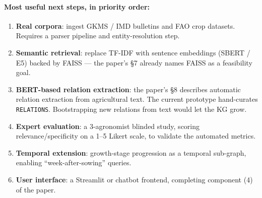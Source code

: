 \documentclass[11pt,a4paper]{article}
\begin{document}
\paragraph{Most useful next steps, in priority order:}\mbox{}

\begin{enumerate}[leftmargin=*]
  \item \textbf{Real corpora}: ingest GKMS / IMD bulletins and FAO
        crop datasets. Requires a parser pipeline and
        entity-resolution step.
  \item \textbf{Semantic retrieval}: replace TF-IDF with sentence
        embeddings (SBERT / E5) backed by FAISS --- the paper's \S7
        already names FAISS as a feasibility goal.
  \item \textbf{BERT-based relation extraction}: the paper's \S8
        describes automatic relation extraction from agricultural
        text. The current prototype hand-curates \texttt{RELATIONS}.
        Bootstrapping new relations from text would let the KG grow.
  \item \textbf{Expert evaluation}: a 3-agronomist blinded study,
        scoring relevance/specificity on a 1--5 Likert scale, to
        validate the automated metrics.
  \item \textbf{Temporal extension}: growth-stage progression as a
        temporal sub-graph, enabling ``week-after-sowing'' queries.
  \item \textbf{User interface}: a Streamlit or chatbot frontend,
        completing component (4) of the paper.
\end{enumerate}

\appendix
\end{document}
